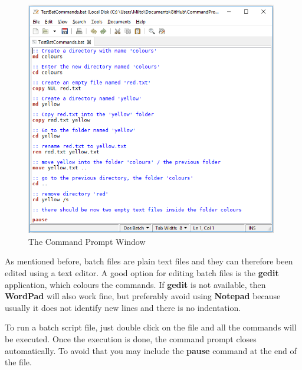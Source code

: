 \documentclass{article}
\begin{document}
		\begin{figure}[!htbp]
			\centering
			\includegraphics[width=0.98\textwidth]{BatCommands.png}
			\caption{The Command Prompt Window}
			\label{fig:BatchFile}
		\end{figure}
	 
	\par As mentioned before, batch files are plain text files and they can therefore been edited using a text editor. A good option for editing batch files is the \textbf{gedit} application, which colours the commands. If \textbf{gedit} is not available, then \textbf{WordPad} will also work fine, but preferably avoid using \textbf{Notepad} because usually it does not identify new lines and there is no indentation. 
	
	\par To run a batch script file, just double click on the file and all the commands will be executed. Once the execution is done, the command prompt closes automatically. To avoid that you may include the \textbf{pause} command at the end of the file. 
	
\end{document}
